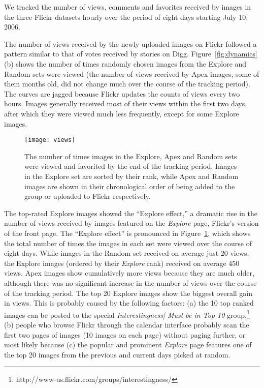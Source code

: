 \documentclass[]{article}
\newcommand{\source}[1]{\textsf{#1}}
\newcommand{\figref}[1]{Figure~\ref{#1}}
\begin{document}
We tracked the number of
views, comments and favorites received by images in the three Flickr
datasets hourly over the period of
eight days starting July 10, 2006.



The number of views received by the newly uploaded images on Flickr followed a pattern similar to
that of votes received by stories on Digg.
\figref{fig:dynamics}(b) shows the number of times randomly chosen
images from the \source{Explore} and \source{Random} sets were
viewed (the number of views received by \source{Apex} images, some of them
months old, did not change much over the course of the tracking period).
The curves are jagged because Flickr updates
the counts of views every two hours. Images generally received most
of their views within the first two days, after which they were
viewed much less frequently, except for some \source{Explore} images.




\begin{figure}[tbh]
\center
  \texttt{[image: views]}

  \caption{The number of times images in the \source{Explore}, \source{Apex} and \source{Random} sets were viewed
  and favorited by the end of the tracking
  period. Images in the \source{Explore} set are sorted by their rank, while \source{Apex} and \source{Random}
  images are shown in their chronological
  order of being added to the group or uploaded to Flickr respectively.}\label{fig:views}
\end{figure}


The top-rated \source{Explore} images showed
the ``Explore effect,'' a dramatic rise in the number of views
received by images featured on the \emph{Explore} page, Flickr's version of the front page.
The ``Explore effect'' is pronounced in \figref{fig:views},
which shows the total number of times the images in each set were
viewed over the course of eight days. While images in the
\source{Random} set received on average just 20 views, the
\source{Explore} images (ordered by their \emph{Explore} rank) received on average 450 views.
\source{Apex} images show cumulatively more views because they are much older,
although there was no significant increase in the number of views
over the course of the tracking period.
The top 20 \source{Explore} images show the biggest overall gain in
views. This is probably caused by the following factors: (a)
the 10 top ranked images can be posted to the special
\emph{Interestingness| Must be in Top
10} group,\footnote{http://www-us.flickr.com/groups/interestingness/}
(b) people who browse Flickr through the calendar interface
probably scan the first two pages of images (10 images on each page)
without paging further, or most
likely because (c) the popular and prominent \emph{Explore} page
features one of the top
20 images from the previous and current days picked at random.
\end{document}
